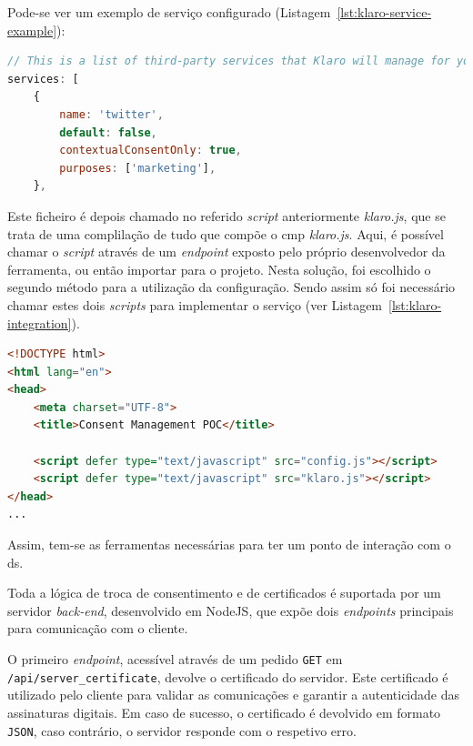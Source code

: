 Pode-se ver um exemplo de serviço configurado (Listagem~\ref{lst:klaro-service-example}):


\begin{lstlisting}[language=Javascript, caption={Exemplo de serviço configurado no \textit{klaro.js}}, label={lst:klaro-service-example}]
// This is a list of third-party services that Klaro will manage for you.
services: [
	{
		name: 'twitter',
		default: false,
		contextualConsentOnly: true,
		purposes: ['marketing'],
	},
\end{lstlisting}

Este ficheiro é depois chamado no referido \textit{script} anteriormente \textit{klaro.js}, que se trata de uma complilação de tudo que compõe o \acrshort{cmp} \textit{klaro.js}. Aqui, é possível chamar o \textit{script} através de um \textit{endpoint} exposto pelo próprio desenvolvedor da ferramenta, ou então importar para o projeto. Nesta solução, foi escolhido o segundo método para a utilização da configuração.
Sendo assim só foi necessário chamar estes dois \textit{scripts} para implementar o serviço (ver Listagem~\ref{lst:klaro-integration}).

\begin{lstlisting}[language=HTML, caption={Integração do \textit{klaro.js} com a configuração local}, label={lst:klaro-integration}]
<!DOCTYPE html>
<html lang="en">
<head>
    <meta charset="UTF-8">
    <title>Consent Management POC</title>

    <script defer type="text/javascript" src="config.js"></script>
    <script defer type="text/javascript" src="klaro.js"></script>
</head>
...
\end{lstlisting}

Assim, tem-se as ferramentas necessárias para ter um ponto de interação com o \acrshort{ds}.

Toda a lógica de troca de consentimento e de certificados é suportada por um servidor \textit{back-end}, desenvolvido em NodeJS, que expõe dois \textit{endpoints} principais para comunicação com o cliente.

O primeiro \textit{endpoint}, acessível através de um pedido \texttt{GET} em \texttt{/api/server\_certificate}, devolve o certificado do servidor. Este certificado é utilizado pelo cliente para validar as comunicações e garantir a autenticidade das assinaturas digitais. Em caso de sucesso, o certificado é devolvido em formato \texttt{JSON}, caso contrário, o servidor responde com o respetivo erro.

